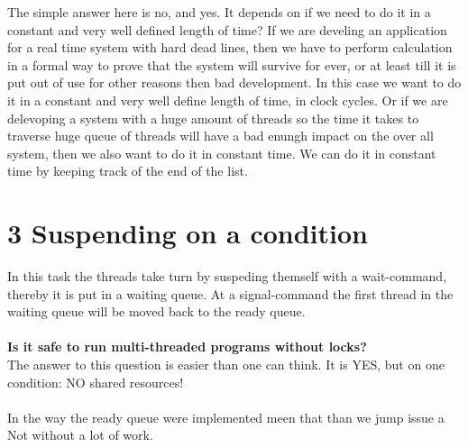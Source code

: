 \documentclass[10pt,a4paper]{article}
\begin{document}
The simple answer here is no, and yes. It depends on if we need to do it in a constant and very well defined length of time? If we are develing an application for a real time system with hard dead lines, then we have to perform calculation in a formal way to prove that the system will survive for ever, or at least till it is put out of use for other reasons then bad development. In this case we want to do it in a constant and very well define length of time, in clock cycles. Or if we are delevoping a system with a huge amount of threads so the time it takes to traverse huge queue of threads will have a bad enungh impact on the over all system, then we also want to do it in constant time. We can do it in constant time by keeping track of the end of the list.\\

\section*{3 Suspending on a condition}
In this task the threads take turn by suspeding themself with a wait-command, thereby it is put in a waiting queue. At a signal-command the first thread in the waiting queue will be moved back to the ready queue.\\
\\
\textbf{Is it safe to run multi-threaded programs without locks?}\\
The answer to this question is easier than one can think. It is YES, but on one condition: NO shared resources!\\
\\
In the way the ready queue were implemented meen that than we jump issue a Not without a lot of work.
\begin{lslisting}
typedef struct green_thread_queue {
  struct green_t *next;
  struct green_t *end;
\end{lslisting}
\end{document}
